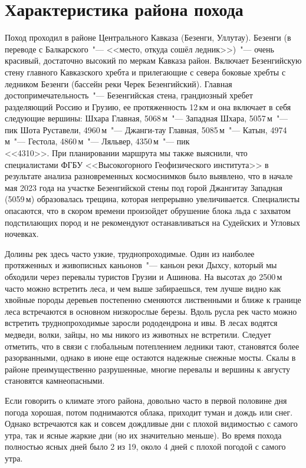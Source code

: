 \section{Характеристика района похода}\label{sec:characteristics_of_area}
    Поход проходил в районе Центрального Кавказа (Безенги, Уллутау). Безенги (в переводе с Балкарского~"---
    <<место, откуда сошёл ледник>>)~"--- очень красивый, достаточно высокий по меркам Кавказа район. Включает
    Безенгийскую стену главного Кавказского хребта и прилегающие с севера боковые хребты с ледником Безенги
    (бассейн реки Черек Безенгийский). Главная достопримечательность~"--- Безенгийская стена, грандиозный хребет
    разделяющий Россию и Грузию, ее протяженность 12\,км и она включает в себя следующие вершины: Шхара Главная,
    5068\,м~"--- Западная Шхара, 5057\,м~"--- пик Шота Руставели, 4960\,м~"--- Джанги-тау Главная, 5085\,м~"---
    Катын, 4974\,м~"--- Гестола, 4860\,м~"--- Ляльвер, 4350\,м~"--- пик\\ <<4310>>. При планировании маршрута мы
    также выяснили, что специалистами ФГБУ <<Высокогорного Геофизического института>> в результате анализа
    разновременных космоснимков было выявлено, что в начале мая 2023 года на участке Безенгийской стены под горой
    Джангитау Западная (5059\,м) образовалась трещина, которая непрерывно увеличивается. Специалисты опасаются, что
    в скором времени произойдет обрушение блока льда с захватом подстилающих пород и не рекомендуют останавливаться
    на Судейских и Угловых ночевках.

    Долины рек здесь часто узкие, труднопроходимые. Один из наиболее протяженных и живописных каньонов~"--- каньон реки
    Дыхсу, который мы обходили через перевалы туристов Грузии и Ашинова. На высотах до 2500\,м часто можно встретить леса,
    и чем выше забираешься, тем лучше видно как хвойные породы деревьев постепенно сменяются лиственными и ближе к границе
    леса встречаются в основном низкорослые березы. Вдоль русла рек часто можно встретить труднопроходимые заросли рододендрона
    и ивы. В лесах водятся медведи, волки, зайцы, но мы никого из животных не встретили. Следует отметить, что в связи с
    глобальным потеплением ледники тают, становятся более разорванными, однако в июне еще остаются надежные снежные мосты.
    Скалы в районе преимущественно разрушенные, многие перевалы и вершины к августу становятся камнеопасными. 

    Если говорить о климате этого района, довольно часто в первой половине дня погода хорошая, потом поднимаются облака,
    приходит туман и дождь или снег. Однако встречаются как и совсем дождливые дни с плохой видимостью с самого утра, так
    и ясные жаркие дни (но их значительно меньше). Во время похода полностью ясных дней было 2 из 19, около 4 дней с плохой
    погодой с самого утра.

